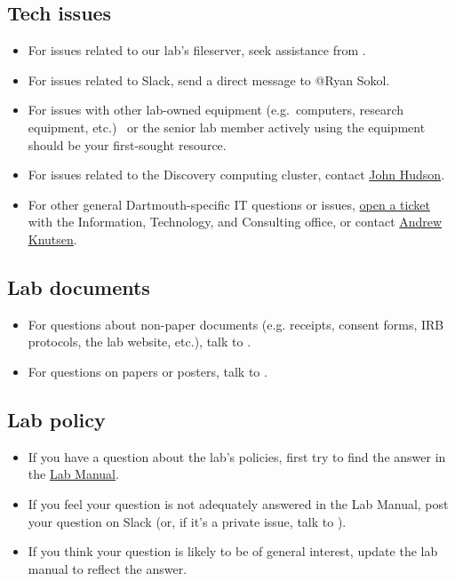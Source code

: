 \documentclass{tufte-book} %
\begin{document}
\subsection{Tech issues}
\begin{itemize}
\item For issues related to our lab's fileserver, seek assistance from
  \director.

\item For issues related to Slack, send a direct message to @Ryan Sokol.

\item For issues with other lab-owned equipment (e.g.~computers,
  research equipment, etc.) \coordinator~or the senior lab member
  actively using the equipment should be your first-sought resource.

\item For issues related to the Discovery computing cluster,
  contact \href{mailto:John.P.Hudson@Dartmouth.edu}{John Hudson}.

\item For other general Dartmouth-specific IT questions or issues,
  \href{help@dartmouth.edu}{open a ticket} with the Information,
  Technology, and Consulting office, or contact
  \href{mailto:Andrew.C.Knutsen@Dartmouth.edu}{Andrew Knutsen}.
\end{itemize}

\subsection{Lab documents}
\begin{itemize}
\item For questions about non-paper documents (e.g. receipts, consent
  forms, IRB protocols, the lab website, etc.), talk to \coordinator.

\item For questions on papers or posters, talk to \director.
\end{itemize}

\subsection{Lab policy}
\begin{itemize}
\item If you have a question about the lab's policies, first try to
  find the answer in the
  \href{https://github.com/ContextLab/lab-manual/tree/master/lab_manual.pdf}{Lab
    Manual}.

\item If you feel your question is not adequately answered in the Lab
  Manual, post your question on Slack (or, if it's a private issue,
  talk to \director).

\item If you think your question is likely to be of general interest,
  update the lab manual to reflect the answer.
\end{itemize}
\end{document}
